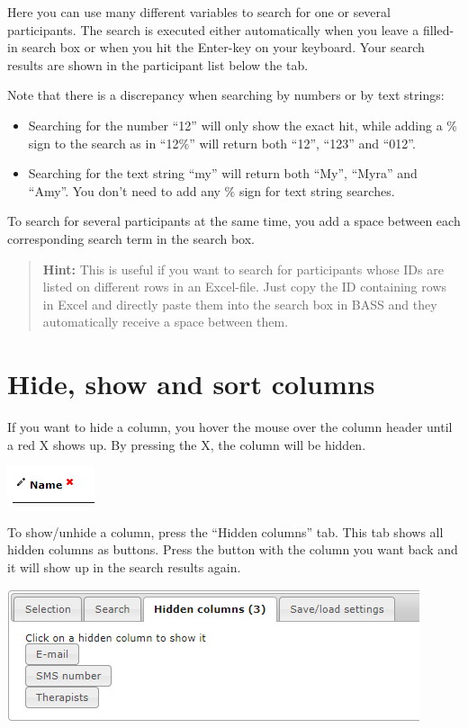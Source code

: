 \documentclass[]{book}
\begin{document}
Here you can use many different variables to search for one or several participants. The search is executed either automatically when you leave a filled-in search box or when you hit the Enter-key on your keyboard. Your search results are shown in the participant list below the tab.

Note that there is a discrepancy when searching by numbers or by text strings:

\begin{itemize}
\item
  Searching for the number ``12'' will only show the exact hit, while adding a \% sign to the search as in ``12\%'' will return both ``12'', ``123'' and ``012''.
\item
  Searching for the text string ``my'' will return both ``My'', ``Myra'' and ``Amy''. You don't need to add any \% sign for text string searches.
\end{itemize}

To search for several participants at the same time, you add a space between each corresponding search term in the search box.

\begin{quote}
\textbf{Hint:} This is useful if you want to search for participants whose IDs are listed on different rows in an Excel-file. Just copy the ID containing rows in Excel and directly paste them into the search box in BASS and they automatically receive a space between them.
\end{quote}

\hypertarget{hide-show-and-sort-columns}{%
\section{Hide, show and sort columns}\label{hide-show-and-sort-columns}}

If you want to hide a column, you hover the mouse over the column header until a red X shows up. By pressing the X, the column will be hidden.

\includegraphics{images/hide-show-sort.png}

To show/unhide a column, press the ``Hidden columns'' tab. This tab shows all hidden columns as buttons. Press the button with the column you want back and it will show up in the search results again.

\includegraphics{images/hidden-columns.png}
\end{document}

